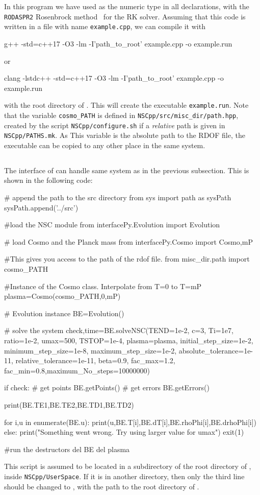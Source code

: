 \documentclass[11pt,a4paper]{article}
\begin{document}
In this program we have used  as the numeric type in all declarations, with the {\tt RODASPR2} Rosenbrock method~\cite{RangAngermann2005} for the RK solver. Assuming that this code is written in a file with name {\tt example.cpp}, we can compile it with 
%
\begin{bash}
	g++ -std=c++17 -O3 -lm -I'path_to_root' example.cpp -o example.run	
\end{bash}
%
or
\begin{bash}
	clang -lstdc++ -std=c++17 -O3 -lm -I'path_to_root' example.cpp -o example.run	
\end{bash}
%
with  the root directory of \nsc. This will create the executable {\tt example.run}. Note that the variable {\tt cosmo\_PATH} is defined in {\tt NSCpp/src/misc\_dir/path.hpp}, created by the script {\tt NSCpp/configure.sh} if a {\em relative} path is given in {\tt NSCpp/PATHS.mk}. As This variable is the absolute path to the RDOF file, the executable can be copied to any other place in the same system.

\subsection{\PY}
%
The \PY interface of \nsc can handle same system as in the previous subsection. This is shown in the following code:
%
\begin{py}
# append the path to the src directory 
from sys import path as sysPath
sysPath.append('../src')

#load the NSC module
from interfacePy.Evolution import Evolution 

# load Cosmo and the Planck mass
from interfacePy.Cosmo import Cosmo,mP 

#This gives you access to the path of the rdof file.
from misc_dir.path import cosmo_PATH

#Instance of the Cosmo class. Interpolate from T=0 to T=mP
plasma=Cosmo(cosmo_PATH,0,mP)

# Evolution instance
BE=Evolution()

# solve the system
check,time=BE.solveNSC(TEND=1e-2, c=3, Ti=1e7, ratio=1e-2, umax=500, TSTOP=1e-4, plasma=plasma,
				initial_step_size=1e-2, minimum_step_size=1e-8, maximum_step_size=1e-2, 
				absolute_tolerance=1e-11, relative_tolerance=1e-11, beta=0.9, fac_max=1.2, 
				fac_min=0.8,maximum_No_steps=10000000)

if check:
	# get points 
	BE.getPoints()
	# get errors
	BE.getErrors()

print(BE.TE1,BE.TE2,BE.TD1,BE.TD2)

for i,u in enumerate(BE.u):
	print(u,BE.T[i],BE.dT[i],BE.rhoPhi[i],BE.drhoPhi[i])
else:
	print("Something went wrong. Try using larger value for umax")
	exit(1)

#run the destructors
del BE
del plasma
\end{py}
%
This script is assumed to be located in a subdirectory of the root directory of \nsc, \eg inside {\tt NSCpp/UserSpace}. If it is in another directory, then only the third line should be changed to , with  the path to the root directory of \nsc.
\end{document}
